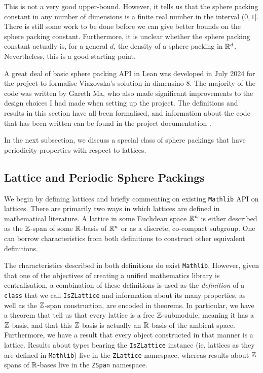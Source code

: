 This is not a very good upper-bound. However, it tells us that the sphere packing constant in any number of dimensions is a finite real number in the interval $(0, 1]$. There is still some work to be done before we can give better bounds on the sphere packing constant. Furthermore, it is unclear whether the sphere packing constant actually is, for a general $d$, the density of a sphere packing in $\mathbb{R}^d$. Nevertheless, this is a good starting point.

A great deal of basic sphere packing API in Lean was developed in July 2024 for the project to formalise Viazovska's solution in dimensino $8$. The majority of the code was written by Gareth Ma, who also made significant improvements to the design choices I had made when setting up the project. The definitions and results in this section have all been formalised, and information about the code that has been written can be found in the project documentation \cite[\texttt{SpherePacking.Basic.SpherePacking}]{documentation}.

In the next subsection, we discuss a special class of sphere packings that have periodicity properties with respect to lattices.

\subsection{Lattice and Periodic Sphere Packings}

We begin by defining lattices and briefly commenting on existing \verb|Mathlib| API on lattices. There are primarily two ways in which lattices are defined in mathematical literature. A lattice in some Euclidean space $\mathbb{R}^n$ is either described as the $\mathbb{Z}$-span of some $\mathbb{R}$-basis of $\mathbb{R}^n$ or as a discrete, co-compact subgroup. One can borrow characteristics from both definitions to construct other equivalent definitions.

The characteristics described in both definitions do exist \verb|Mathlib|. However, given that one of the objectives of creating a unified mathematics library is centralisation, a combination of these definitions is used as the \textit{definition} of a \verb|class| that we call \verb|IsZLattice| and information about its many properties, as well as the $\mathbb{Z}$-span construction, are encoded in theorems. In particular, we have a theorem that tell us that every lattice is a free $\mathbb{Z}$-submodule, meaning it has a $\mathbb{Z}$-basis, and that this $\mathbb{Z}$-basis is actually an $\mathbb{R}$-basis of the ambient space. Furthermore, we have a result that every object constructed in that manner is a lattice. Results about types bearing the \verb|IsZLattice| instance (ie, lattices as they are defined in \verb|Mathlib|) live in the \verb|ZLattice| namespace, whereas results about $\mathbb{Z}$-spans of $\mathbb{R}$-bases live in the \verb|ZSpan| namespace. 

